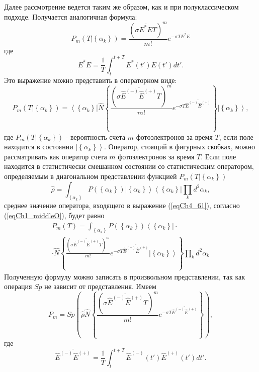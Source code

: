 Далее рассмотрение ведется таким же образом, как и при
полуклассическом подходе. Получается аналогичная формула: 
\begin{equation}
P_m\left(\left.T\right|\left\{\alpha_k\right\}\right) = 
\frac{\left(\sigma \overline{E^\ast E} T\right)^m}{m!}
e^{- \sigma T \overline{E^\ast E}}
\label{eqCh4_60}
\end{equation}
где
\[
\overline{E^\ast E} = \frac{1}{T} \int_t^{t + T}E^\ast\left(t'\right)
E\left(t'\right)dt'.
\]
Это выражение можно представить в операторном виде:
\begin{equation}
P_m\left(\left.T\right|\left\{\alpha_k\right\}\right) = 
\left<\left\{\alpha_k\right\}\right|
\hat{N}
\left\{
\frac{\left(\sigma \overline{\hat{E}^{(-)} \hat{E}^{(+)}} T\right)^m}{m!}
e^{- \sigma T \overline{\hat{E}^{(-)} \hat{E}^{(+)}}}
\right\}
\left|\left\{\alpha_k\right\}\right>,
\label{eqCh4_61}
\end{equation}
где $P_m\left(\left.T\right|\left\{\alpha_k\right\}\right)$ -
вероятность счета $m$ фотоэлектронов за время $T$,  если поле
находится в состоянии $\left|\left\{\alpha_k\right\}\right>$.
Оператор, стоящий в фигурных скобках, можно 
рассматривать как оператор счета $m$ фотоэлектронов за время $T$.  Если
поле находится в статистически смешанном состоянии со статистическим
оператором, определяемым в диагональном представлении функцией 
$P_m\left(\left.T\right|\left\{\alpha_k\right\}\right)$
\[
\hat{\rho} = \int_{\left\{\alpha_k\right\}}
P\left(\left\{\alpha_k\right\}\right)
\left|\left\{\alpha_k\right\}\right>
\left<\left\{\alpha_k\right\}\right|
\prod_k d^2\alpha_k,
\]
среднее значение оператора, входящего в выражение (\ref{eqCh4_61}),
согласно (\ref{eqCh1_middleO}), будет равно 
\begin{eqnarray}
P_m\left(T\right) =
\int_{\left\{\alpha_k\right\}}
P\left(\left\{\alpha_k\right\}\right)
\left<\left\{\alpha_k\right\}\right|
\cdot
\nonumber \\
\cdot 
\hat{N}
\left\{
\frac{\left(\sigma \overline{\hat{E}^{(-)} \hat{E}^{(+)}} T\right)^m}{m!}
e^{- \sigma T \overline{\hat{E}^{(-)} \hat{E}^{(+)}}}
\left|\left\{\alpha_k\right\}\right>
\right\}
\prod_k d^2\alpha_k
\label{eqCh4_62}
\end{eqnarray}
Полученную формулу можно записать в произвольном представлении, так
как операция $Sp$ не зависит от представления. Имеем 
\begin{equation}
P_m = Sp\left(
\hat{\rho}
\hat{N}
\left\{
\frac{\left(\sigma \overline{\hat{E}^{(-)} \hat{E}^{(+)}} T\right)^m}{m!}
e^{- \sigma T \overline{\hat{E}^{(-)} \hat{E}^{(+)}}}
\right\}
\right),
\label{eqCh4_63}
\end{equation}
где
\[
\overline{\hat{E}^{(-)} \hat{E}^{(+)}} = \frac{1}{T} \int_t^{t + T}\hat{E}^{(-)}\left(t'\right)
\hat{E}^{(+)}\left(t'\right)dt'.
\]

